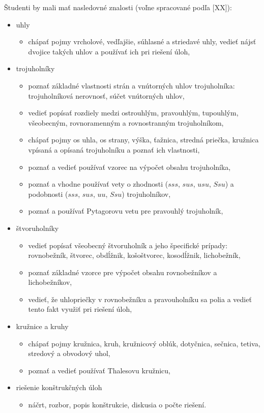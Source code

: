 \documentclass[11pt,a4paper,oneside,final]{book}
\begin{document}
Študenti by mali mať nasledovné znalosti (voľne spracované podľa [XX]):
\begin{itemize}
\item uhly
\begin{itemize}
\item chápať pojmy vrcholové, vedľajšie, súhlasné a striedavé uhly, vedieť nájsť dvojice takých uhlov a používať ich pri riešení úloh,
\end{itemize}
\item trojuholníky
\begin{itemize}
\item poznať základné vlastnosti strán a vnútorných uhlov trojuholníka: trojuholníková nerovnosť, súčet vnútorných uhlov,
\item vedieť popísať rozdiely medzi ostrouhlým, pravouhlým, tupouhlým, všeobecným, rovnoramenným a rovnostranným trojuholníkom,
\item chápať pojmy os uhla, os strany, výška, ťažnica, stredná priečka, kružnica vpísaná a opísaná trojuholníku a poznať ich vlastnosti,
\item poznať a vedieť používať vzorec na výpočet obsahu trojuholníka,
\item poznať a vhodne používať vety o zhodnosti ($sss$, $sus$, $usu$, $Ssu$) a podobnosti ($sss$, $sus$, $uu$, $Ssu$) trojuholníkov,
\item poznať a používať Pytagorovu vetu pre pravouhlý trojuholník,
\end{itemize}
\item štvoruholníky
\begin{itemize}
\item vedieť popísať všeobecný štvoruholník a jeho špecifické prípady: rovnobežník, štvorec, obdĺžnik, košoštvorec, kosodĺžnik, lichobežník,
\item poznať základné vzorce pre výpočet obsahu rovnobežníkov a lichobežníkov,
\item vedieť, že uhlopriečky v rovnobežníku a pravouholníku sa polia a vedieť tento fakt využiť pri riešení úloh,
\end{itemize}
\item kružnice a kruhy
\begin{itemize}
\item chápať pojmy kružnica, kruh, kružnicový oblúk, dotyčnica, sečnica, tetiva, stredový a obvodový uhol,
\item poznať a vedieť používať Thalesovu kružnicu,
\end{itemize}
\item riešenie konštrukčných úloh
\begin{itemize}
\item náčrt, rozbor, popis konštrukcie, diskusia o počte riešení.
\end{itemize}
\end{itemize}
\end{document}
